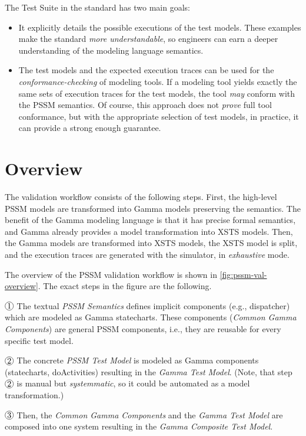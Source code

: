 The Test Suite in the standard has two main goals:
\begin{itemize}
    \item It explicitly details the possible executions of the test models. These examples make the standard \textit{more understandable}, so engineers can earn a deeper understanding of the modeling language semantics.
    \item The test models and the expected execution traces can be used for the \textit{conformance-checking} of modeling tools. If a modeling tool yields exactly the same sets of execution traces for the test models, the tool \textit{may} conform with the PSSM semantics. Of course, this approach does not \textit{prove} full tool conformance, but with the appropriate selection of test models, in practice, it can provide a strong enough guarantee.
\end{itemize}

\section{Overview}\label{sec:overview}

The validation workflow consists of the following steps. First, the high-level PSSM models are transformed into Gamma models preserving the semantics. The benefit of the Gamma modeling language is that it has precise formal semantics, and Gamma already provides a model transformation into XSTS models. Then, the Gamma models are transformed into XSTS models, the XSTS model is split, and the execution traces are generated with the simulator, in \textit{exhaustive} mode.

The overview of the PSSM validation workflow is shown in \autoref{fig:pssm-val-overview}. The exact steps in the figure are the following.

$\cir{1}$ The textual \textit{PSSM Semantics} defines implicit components (e.g., dispatcher) which are modeled as Gamma statecharts. These components (\textit{Common Gamma Components}) are general PSSM components, i.e., they are reusable for every specific test model.

$\cir{2}$ The concrete \textit{PSSM Test Model} is modeled as Gamma components (statecharts, doActivities) resulting in the \textit{Gamma Test Model}. (Note, that step $\cir{2}$ is manual but \textit{systemmatic}, so it could be automated as a model transformation.)

$\cir{3}$ Then, the \textit{Common Gamma Components} and the \textit{Gamma Test Model} are composed into one system resulting in the \textit{Gamma Composite Test Model}.

